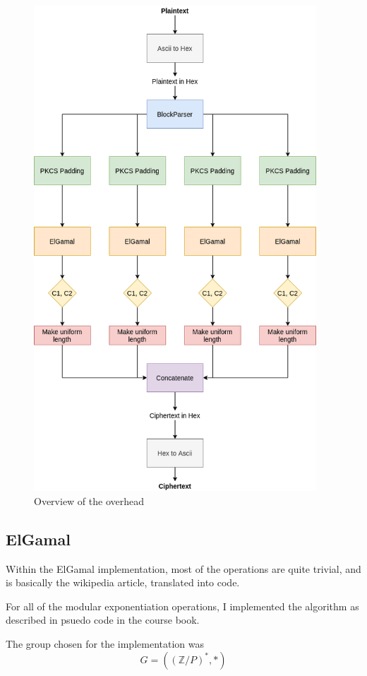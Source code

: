 \documentclass{article}
\begin{document}
\begin{figure}[H]
 \centering
  \includegraphics[width=300pt]{img/overview.png}
 \caption{Overview of the overhead}
 \label{rOVERHEAD}
 \end{figure}

\subsection{ElGamal}

Within the ElGamal implementation, most of the operations are quite trivial, and is basically the wikipedia article, translated into code.

For all of the modular exponentiation operations, I implemented the algorithm as described in psuedo code in the course book\cite{ROSEN}.

The group chosen for the implementation was
\begin{equation*}
  G =((\mathbb{Z}/P)^{*}, *)
\end{equation*}
\end{document}
